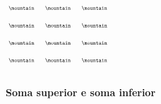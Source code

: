 \documentclass[oneside,12pt]{article}
\begin{document}
\unitlength=8pt

\vspace*{-0.25cm}
\hspace*{-0.5cm}
$\scalebox{0.55}{$
 \begin{array}{ccccc}
 \mountain && \mountain && \mountain \\[20pt]
 \mountain && \mountain && \mountain \\[20pt]
 \mountain && \mountain && \mountain \\[20pt]
 \mountain && \mountain && \mountain \\[20pt]
 \end{array}
 $}
$

\newpage

%

{\bf Soma superior e soma inferior}
\end{document}
